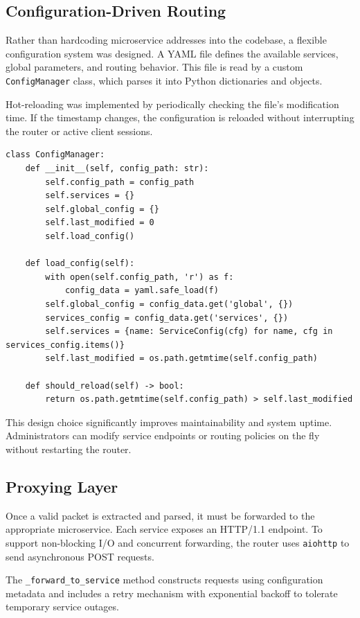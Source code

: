 \subsection{Configuration-Driven Routing}

Rather than hardcoding microservice addresses into the codebase, a flexible configuration system was designed. A YAML file defines the available services, global parameters, and routing behavior. This file is read by a custom \texttt{ConfigManager} class, which parses it into Python dictionaries and objects.

Hot-reloading was implemented by periodically checking the file’s modification time. If the timestamp changes, the configuration is reloaded without interrupting the router or active client sessions.

\begin{lstlisting}
class ConfigManager:
    def __init__(self, config_path: str):
        self.config_path = config_path
        self.services = {}
        self.global_config = {}
        self.last_modified = 0
        self.load_config()

    def load_config(self):
        with open(self.config_path, 'r') as f:
            config_data = yaml.safe_load(f)
        self.global_config = config_data.get('global', {})
        services_config = config_data.get('services', {})
        self.services = {name: ServiceConfig(cfg) for name, cfg in services_config.items()}
        self.last_modified = os.path.getmtime(self.config_path)

    def should_reload(self) -> bool:
        return os.path.getmtime(self.config_path) > self.last_modified
\end{lstlisting}

This design choice significantly improves maintainability and system uptime. Administrators can modify service endpoints or routing policies on the fly without restarting the router.

\subsection{Proxying Layer}

Once a valid packet is extracted and parsed, it must be forwarded to the appropriate microservice. Each service exposes an HTTP/1.1 endpoint. To support non-blocking I/O and concurrent forwarding, the router uses \texttt{aiohttp} to send asynchronous POST requests.

The \texttt{\_forward\_to\_service} method constructs requests using configuration metadata and includes a retry mechanism with exponential backoff to tolerate temporary service outages.

